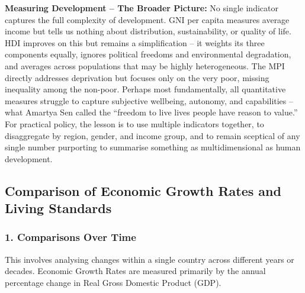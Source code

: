 \documentclass[11pt, a4paper, twoside]{book}
\begin{document}
\textbf{Measuring Development -- The Broader Picture:} No single indicator captures the full complexity of development. GNI per capita measures average income but tells us nothing about distribution, sustainability, or quality of life. HDI improves on this but remains a simplification -- it weights its three components equally, ignores political freedoms and environmental degradation, and averages across populations that may be highly heterogeneous. The MPI directly addresses deprivation but focuses only on the very poor, missing inequality among the non-poor. Perhaps most fundamentally, all quantitative measures struggle to capture subjective wellbeing, autonomy, and capabilities -- what Amartya Sen called the ``freedom to live lives people have reason to value.'' For practical policy, the lesson is to use multiple indicators together, to disaggregate by region, gender, and income group, and to remain sceptical of any single number purporting to summarise something as multidimensional as human development.

\subsection{Comparison of Economic Growth Rates and Living Standards}

\subsubsection{1. Comparisons Over Time}

This involves analysing changes within a single country across different years or decades. Economic Growth Rates are measured primarily by the annual percentage change in Real Gross Domestic Product (GDP).
\end{document}
